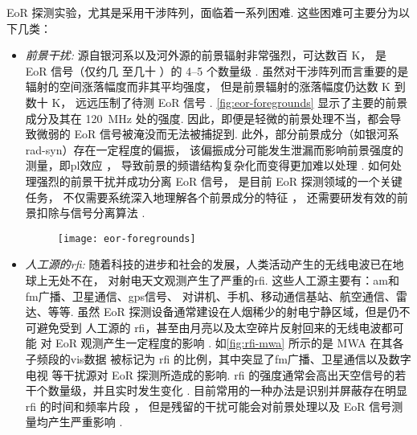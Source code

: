 EoR 探测实验，尤其是采用干涉阵列，面临着一系列困难.
这些困难可主要分为以下几类：
\begin{itemize}
\item
\emph{前景干扰:}
源自银河系以及河外源的前景辐射非常强烈，可达数百 \si{\kelvin}，
是 EoR 信号（仅约几 \si{\mK} 至几十 \si{\mK}）的 \numrange{4}{5} 个数量级
\cite{morales2010}.
虽然对干涉阵列而言重要的是辐射的空间涨落幅度而非其平均强度，
但是前景辐射的涨落幅度仍达数 \si{\kelvin} 到数十 \si{\kelvin}，
远远压制了待测 EoR 信号 \cite{zaroubi2013}.
\autoref{fig:eor-foregrounds} 显示了主要的前景成分及其在
\SI{120}{\MHz} 处的强度.
因此，即便是轻微的前景处理不当，都会导致微弱的 EoR 信号被淹没而无法被捕捉到.
此外，部分前景成分（如银河系\ac{rad-syn}）存在一定程度的偏振，
该偏振成分可能发生泄漏而影响前景强度的测量，即\ac{pl}效应 \cite{cotton1999}，
导致前景的频谱结构复杂化而变得更加难以处理
\cite{jelic2014,asad2015,asad2016,asad2018,gehlot2018}.
如何处理强烈的前景干扰并成功分离 EoR 信号，
是目前 EoR 探测领域的一个关键任务，
不仅需要系统深入地理解各个前景成分的特征
\cite{jelic2008,jelic2010,wang2010,liu2012,offringa2016,
  carroll2016,murray2017,procopio2017,spinelli2018}，
还需要研发有效的前景扣除与信号分离算法
\cite{wang2006,jelic2008,harker2009,liu2009fgrm,chapman2012,chapman2013,
  gu2013,wang2013,bonaldi2015,chapman2015,chapman2016,mertens2018}.

\begin{figure}[tbp]
  \centering
  \texttt{[image: eor-foregrounds]}
  \label{fig:eor-foregrounds}
\end{figure}

\item
\emph{人工源的\acl{rfi}:}
随着科技的进步和社会的发展，人类活动产生的无线电波已在地球上无处不在，
对射电天文观测产生了严重的\acf{rfi}.
这些人工源主要有：\ac{am}和\ac{fm}广播、卫星通信、\ac{gps}信号、
对讲机、手机、移动通信基站、航空通信、雷达、等等.
虽然 EoR 探测设备通常建设在人烟稀少的射电宁静区域，但是仍不可避免受到
人工源的 \ac{rfi}，甚至由月亮以及太空碎片反射回来的无线电波都可能
对 EoR 观测产生一定程度的影响 \cite{mcKinley2013,tingay2013rfi}.
如\autoref{fig:rfi-mwa} 所示的是 MWA 在其各子频段的\ac{vis}数据
被标记为 \ac{rfi} 的比例，其中突显了\ac{fm}广播、卫星通信以及数字电视
等干扰源对 EoR 探测所造成的影响.
\ac{rfi} 的强度通常会高出天空信号的若干个数量级，并且实时发生变化 \cite{bentum2011}.
目前常用的一种办法是识别并屏蔽存在明显 \ac{rfi} 的时间和频率片段
\cite{fridman2001,offringa2010,offringa2012,prasad2012,akeret2017}，
但是残留的干扰可能会对前景处理以及 EoR 信号测量均产生严重影响 \cite{offringa2015}.


\end{itemize}
